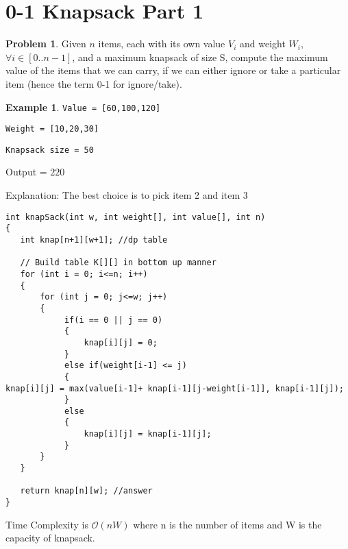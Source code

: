 \documentclass[twoside,12pt,a4paper,english]{book}
\theoremstyle{definition}
\newtheorem*{exmp}{Example}
\theoremstyle{problemstyle}
\newtheorem*{problem}{Problem} %
\theoremstyle{problemstyle}
\theoremstyle{problemstyle}
\begin{document}
\section{0-1 Knapsack Part 1}
\begin{problem}
Given $n$ items, each with its own value $V_i$ and weight $W_i$, $\forall i \in [0..n-1]$, and a
maximum knapsack of size S, compute the maximum value of the items that we can carry, if
we can either ignore or take a particular item (hence the term 0-1 for ignore/take).
\end{problem}
\begin{exmp}


\texttt{Value = [60,100,120]}

\texttt{Weight = [10,20,30]}

\texttt{Knapsack size = 50}

Output = $220$

Explanation: The best choice is to pick item 2 and item 3
\end{exmp}
\begin{tcolorbox}[title=Solution]

\begin{lstlisting}
int knapSack(int w, int weight[], int value[], int n)
{
   int knap[n+1][w+1]; //dp table

   // Build table K[][] in bottom up manner
   for (int i = 0; i<=n; i++)
   {
       for (int j = 0; j<=w; j++)
       {
            if(i == 0 || j == 0)
            {
                knap[i][j] = 0;
            }
            else if(weight[i-1] <= j)
            {
knap[i][j] = max(value[i-1]+ knap[i-1][j-weight[i-1]], knap[i-1][j]);
            }
            else
            {
                knap[i][j] = knap[i-1][j];
            }
       }
   }

   return knap[n][w]; //answer
}
\end{lstlisting}
Time Complexity is $\mathcal{O}(nW)$ where n is the number of items and W is the capacity of knapsack.
\end{tcolorbox}
\end{document}
